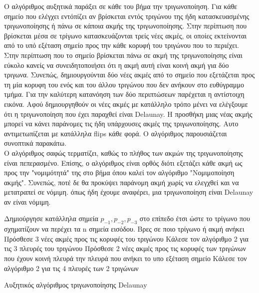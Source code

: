 \documentclass[oneside,12pt]{book}
\theoremstyle{definition}
\begin{document}
Ο αλγόριθμος αυξητικά παράξει σε κάθε του βήμα την τριγωνοποίηση. Για κάθε σημείο που ελέγχει εντόπίζει αν βρίσκεται εντός τριγώνου της ήδη κατασκευασμένης τριγωνοποίησης ή πάνω σε κάποια ακμής της τριγωνοποίησης. Στην περίπτωση που βρίσκεται μέσα σε τρίγωνο κατασκευάζονται τρείς νέες ακμές, οι οποίες εκτείνονται από το υπό εξέταση σημείο προς την κάθε κορυφή του τριγώνου που το περιέχει. Στην περίπτωση που το σημείο βρίσκεται πάνω σε ακμή της τριγωνοποίησης είναι εύκολο κανείς να συνειδητοποιήσει ότι η ακμή αυτή είναι κοινή ακμή για δύο τριγωνα. Συνεπώς, δημιουργούνται δύο νέες ακμές από το σημείο που εξετάζεται προς τη μία κορυφη του ενός και του άλλου τριγώνου που δεν ανήκουν στο ευθύγραμμο τμήμα. Για την καλύτερη κατανόηση των δύο περιπτώσεων παρέχεται η αντίστοιχη εικόνα. Αφού δημιουργηθούν οι νέες ακμές με κατάλληλο τρόπο μένει να ελέγξουμε ότι η τριγωνοποίηση που έχει παραχθεί είναι Delaunay. Η προσθήκη μιας νέας ακμής μπορεί να κάνει παράνομες τις ήδη υπάρχουσες ακμές της τριγωνοποίησης. Αυτο αντιμετωπίζεται με κατάλληλα flips κάθε φορά. Ο αλγόριθμος παρουσιάζεται συνοπτικά παρακάτω. \\

Ο αλγόριθμος σαφώς τερματίζει, καθώς το πλήθος των ακμών της τριγωνοποίησης είναι πεπερασμένο. Επίσης, ο αλγόριθμος είναι ορθός διότι εξετάζει κάθε ακμή ως προς την "νομιμότητά" της στο βήμα όπου καλεί τον αλγόριθμο "Νομιμοποίηση ακμής". Συνεπώς, ποτέ δε θα προκύψει παράνομη ακμή χωρίς να ελεγχθεί και να μετατραπεί σε νόμιμη. όπως ήδη έχουμε αναφέρει, μια τριγωνοποίηση είναι Delaunay αν είναι νόμιμη. \\

\begin{algorithm}[H]
	\SetAlgoLined
	
	Δημιούργησε κατάλληλα σημεία \(p_{-1}, p_{-2}, p_{-3}\) στο επίπεδο έτσι ώστε το τρίγωνο που σχηματίζουν να περέχει τα n σημεία εισόδου. \;
	{Βρες σε ποιο τρίγωνο ή ακμή ανήκει \;
		{Πρόσθεσε 3 νέες ακμές προς τις κορυφές του τριγώνου \;
		Κάλεσε τον αλγόριθμο 2 για τις 3 πλευρές του τριγώνου \;}
	\Else
		{Πρόσθεσε 2 νέες ακμές προς τις κορυφές των τριγώνων που έχουν κοινή πλευρά την πλευρά που ανήκει το υπο εξέταση σημείο \;
		Κάλεσε τον αλγόριθμο 2 για τις 4 πλευρές των 2 τριγώνων \;}
	}	
	
	\caption{Αυξητικός αλγόριθμος τριγωνοποίησης Delaunay}
\end{algorithm}
\end{document}

